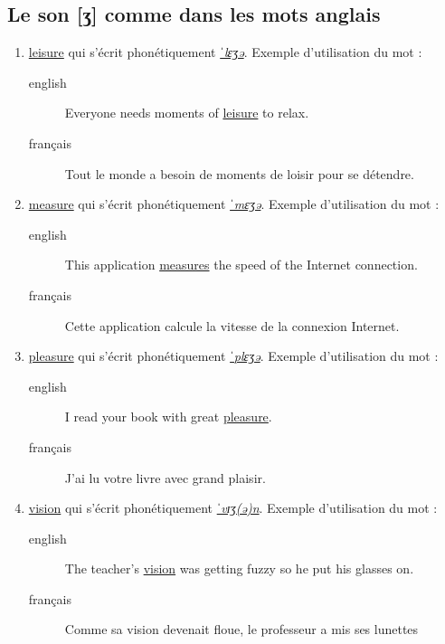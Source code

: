 \documentclass[12pt,a4paper]{book}
\begin{document}
\subsection{Le son [ʒ] comme dans les mots anglais}
\label{sec:orga03cd2d}
\begin{enumerate}
\item \href{http://www.wordreference.com/enfr/leisure}{leisure} qui s'écrit phonétiquement \href{https://en.oxforddictionaries.com/definition/leisure}{\emph{ˈlɛʒə}}. Exemple d'utilisation du mot :
\begin{description}
\item[{english}] \textenglish{Everyone needs moments of \href{https://youtu.be/VSRFE7E4qWI}{leisure} to relax.}
\item[{français}] Tout le monde a besoin de moments de loisir pour se
détendre.
\end{description}
\item \href{http://www.wordreference.com/enfr/measure}{measure} qui s'écrit phonétiquement \href{https://en.oxforddictionaries.com/definition/measure}{\emph{ˈmɛʒə}}. Exemple d'utilisation du mot :
\begin{description}
\item[{english}] \textenglish{This application \href{https://youtu.be/bN60fb9fzKg}{measures} the speed of the Internet
connection.}
\item[{français}] Cette application calcule la vitesse de la connexion
Internet.
\end{description}
\item \href{http://www.wordreference.com/enfr/pleasure}{pleasure} qui s'écrit phonétiquement \href{https://en.oxforddictionaries.com/definition/pleasure}{\emph{ˈplɛʒə}}. Exemple d'utilisation du mot :
\begin{description}
\item[{english}] \textenglish{I read your book with great \href{https://youtu.be/Q4-VK5uqY34}{pleasure}.}
\item[{français}] J'ai lu votre livre avec grand plaisir.
\end{description}
\item \href{http://www.wordreference.com/enfr/vision}{vision} qui s'écrit phonétiquement \href{https://en.oxforddictionaries.com/definition/vision}{\emph{ˈvɪʒ(ə)n}}. Exemple d'utilisation du mot :
\begin{description}
\item[{english}] \textenglish{The teacher's \href{https://youtu.be/lk7lIhAmwHI}{vision} was getting fuzzy so he put his
glasses on.}
\item[{français}] Comme sa vision devenait floue, le professeur a mis
ses lunettes
\end{description}
\end{enumerate}
\end{document}
